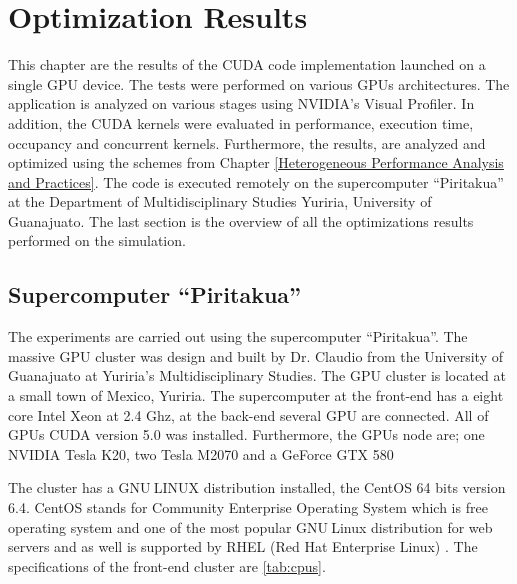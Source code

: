 
\chapter{Optimization Results} %

\label{Optimization Results} %


This chapter are the results of the CUDA code implementation launched on a single GPU device. The tests were performed on various GPUs architectures. The application is analyzed on various stages using NVIDIA's Visual Profiler. In addition, the CUDA kernels were evaluated in performance, execution time, occupancy and concurrent kernels. Furthermore, the results, are analyzed and optimized using the schemes from Chapter \ref{Heterogeneous Performance Analysis and Practices}. The code is executed remotely on the supercomputer ``Piritakua'' at the Department of Multidisciplinary Studies Yuriria, University of Guanajuato. The last section is the overview of all the optimizations results performed on the simulation.

\section{Supercomputer ``Piritakua''}

The experiments are carried out using the supercomputer “Piritakua”. The massive GPU cluster was design and built by Dr. Claudio from the University of Guanajuato at Yuriria's Multidisciplinary Studies. The GPU cluster is located at a small town of Mexico, Yuriria. The supercomputer at the front-end has a eight core Intel Xeon at 2.4 Ghz, at the back-end several GPU are connected. All of GPUs CUDA version 5.0 was installed. Furthermore, the GPUs node are; one NVIDIA Tesla K20, two Tesla M2070 and a GeForce GTX 580 

The cluster has a GNU$ \ $LINUX distribution installed, the CentOS 64 bits version 6.4. CentOS stands for Community Enterprise Operating System which is free operating system and one of the most popular GNU$ \ $Linux distribution for web servers and as well is supported by RHEL (Red Hat Enterprise Linux) \cite{centos}. The specifications of the front-end cluster are \ref{tab:cpus}.

